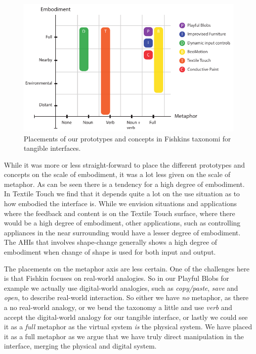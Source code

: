 \begin{figure}[h]
  \centering
  \includegraphics[width=.9\textwidth]{figures/adhoc2/fishkin.pdf}
  \caption[Placements of our prototypes and concepts in Fishkins taxonomi]
  {Placements of our prototypes and concepts in Fishkins taxonomi for tangible interfaces.}
  \label{fig:ch:adhoc2:fishkin}
\end{figure}

While it was more or less straight-forward to place the different prototypes and concepts on the scale of embodiment, it was a lot less given on the scale of metaphor.
As can be seen there is a tendency for a high degree of embodiment.
In Textile Touch we find that it depends quite a lot on the use situation as to how embodied the interface is.
While we envision situations and applications where the feedback and content is on the Textile Touch surface, where there would be a high degree of embodiment, other applications, such as controlling appliances in the near surrounding would have a lesser degree of embodiment.
The AHIs that involves shape-change generally shows a high degree of embodiment when change of shape is used for both input and output.

The placements on the metaphor axis are less certain.
One of the challenges here is that Fishkin focuses on real-world analogies.
So in our Playful Blobs for example we actually use digital-world analogies, such as \emph{copy/paste}, \emph{save} and \emph{open}, to describe real-world interaction.
So either we have \emph{no} metaphor, as there a no real-world analogy, or we bend the taxonomy a little and use \emph{verb} and accept the digital-world analogy for our tangible interface, or lastly we could see it as a \emph{full} metaphor as the virtual system \emph{is} the
physical system. 
We have placed it as a full metaphor as we argue that we have truly direct manipulation in the interface, merging the physical and digital system.

